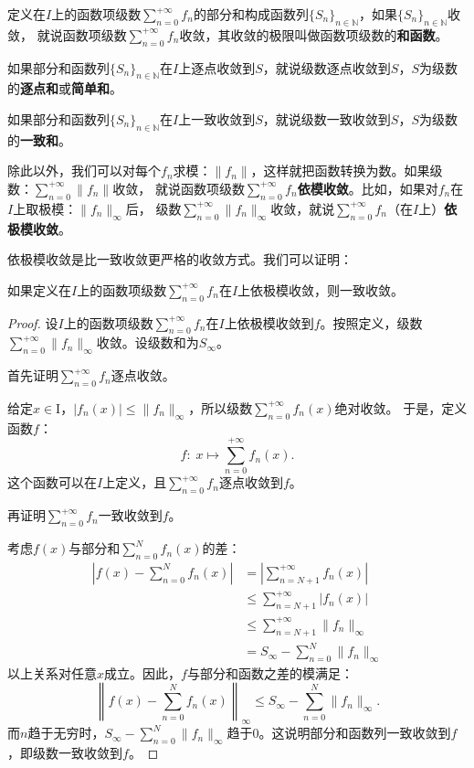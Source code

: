 \documentclass[12pt,UTF8]{ctexbook}
\begin{document}
\begin{appendix}
定义在$I$上的函数项级数$\sum_{n=0}^{+\infty} f_n$的部分和构成函数列$\{S_n\}_{n\in\mathbb{N}}$，如果$\{S_n\}_{n\in\mathbb{N}}$收敛，
就说函数项级数$\sum_{n=0}^{+\infty} f_n$收敛，其收敛的极限叫做函数项级数的\textbf{和函数}。

如果部分和函数列$\{S_n\}_{n\in\mathbb{N}}$在$I$上逐点收敛到$S$，就说级数逐点收敛到$S$，$S$为级数的\textbf{逐点和}或\textbf{简单和}。

如果部分和函数列$\{S_n\}_{n\in\mathbb{N}}$在$I$上一致收敛到$S$，就说级数一致收敛到$S$，$S$为级数的\textbf{一致和}。

除此以外，我们可以对每个$f_n$求模：$\|f_n\|$，这样就把函数转换为数。如果级数：$\sum_{n=0}^{+\infty} \|f_n\|$收敛，
就说函数项级数$\sum_{n=0}^{+\infty} f_n$\textbf{依模收敛}。比如，如果对$f_n$在$I$上取极模：$\|f_n\|_{\infty}$后，
级数$\sum_{n=0}^{+\infty} \|f_n\|_{\infty}$收敛，就说$\sum_{n=0}^{+\infty} f_n$（在$I$上）\textbf{依极模收敛}。

依极模收敛是比一致收敛更严格的收敛方式。我们可以证明：
\begin{tm}
    如果定义在$I$上的函数项级数$\sum_{n=0}^{+\infty} f_n$在$I$上依极模收敛，则一致收敛。
\end{tm}

\begin{proof}
    设$I$上的函数项级数$\sum_{n=0}^{+\infty} f_n$在$I$上依极模收敛到$f$。按照定义，级数
    $\sum_{n=0}^{+\infty} \|f_n\|_{\infty}$收敛。设级数和为$S_{\infty}$。

    首先证明$\sum_{n=0}^{+\infty} f_n$逐点收敛。

    给定$x\in $I，$|f_n(x)| \leqslant \| f_n \|_{\infty}$，所以级数$\sum_{n=0}^{+\infty} f_n(x)$绝对收敛。
    于是，定义函数$f$：
    $$ f : \; x\mapsto \sum_{n=0}^{+\infty} f_n(x). $$
    这个函数可以在$I$上定义，且$\sum_{n=0}^{+\infty} f_n$逐点收敛到$f$。

    再证明$\sum_{n=0}^{+\infty} f_n$一致收敛到$f$。

    考虑$f(x)$与部分和$\sum_{n=0}^N f_n(x)$的差：
    \begin{align*}
        \left| f(x) - \sum_{n=0}^N f_n(x) \right| &= \left| \sum_{n=N+1}^{+\infty} f_n(x) \right| \\
        &\leqslant \sum_{n=N+1}^{+\infty} |f_n(x)| \\
        &\leqslant \sum_{n=N+1}^{+\infty} \|f_n\|_{\infty} \\
        &= S_{\infty} - \sum_{n=0}^N \|f_n\|_{\infty}
    \end{align*}
    以上关系对任意$x$成立。因此，$f$与部分和函数之差的模满足：
    $$ \left\| f(x) - \sum_{n=0}^N f_n(x) \right\|_{\infty} \leqslant S_{\infty} - \sum_{n=0}^N \|f_n\|_{\infty}. $$
    而$n$趋于无穷时，$S_{\infty} - \sum_{n=0}^N \|f_n\|_{\infty}$趋于$0$。这说明部分和函数列一致收敛到$f$，即级数一致收敛到$f$。


\end{proof}
\end{appendix}
\end{document}
